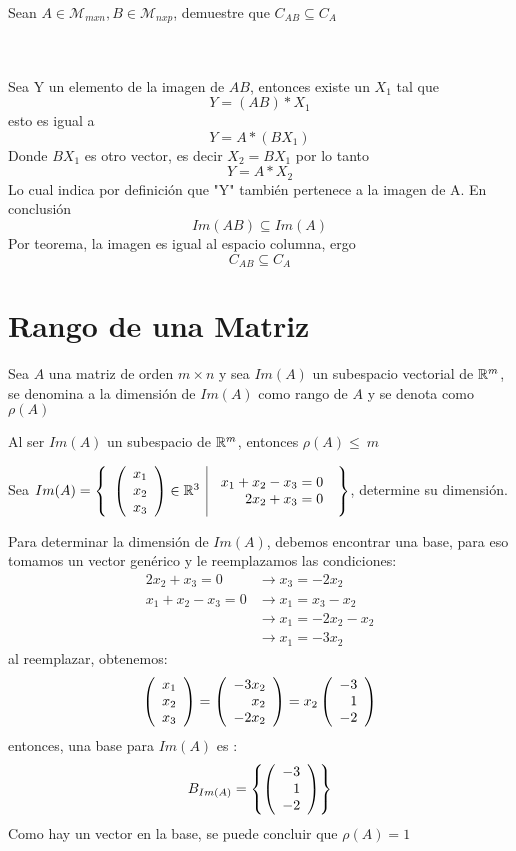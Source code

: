 \begin{ejercicio}
Sean $A\in \mathcal{M}_{mxn}, B \in \mathcal{M}_{nxp}$, demuestre que $C_{AB}\subseteq C_A$


\sol
~\\
~\\
Sea Y un elemento de la imagen de $AB$, entonces existe un $X_1$ tal que 
$$Y=(AB)*X_1$$
esto es igual a 
$$Y=A*(BX_1)$$
Donde $BX_1$ es otro vector, es decir $X_2=BX_1$
por lo tanto
$$Y=A*X_2$$
Lo cual indica por definición que "Y" también pertenece a la imagen de A.
En conclusión $$Im(AB) \subseteq Im(A)$$
Por teorema, la imagen es igual al espacio columna, ergo
$$C_{AB} \subseteq C_A$$

\end{ejercicio}

\newpage
\section{Rango de una Matriz}
\begin{dfn}
Sea $A$ una matriz de orden $m\times n$ y sea $Im(A)$ un subespacio vectorial de $\mathbb{R}^m$, se denomina a la dimensión de $Im(A)$ como rango de $A$ y se denota como $\rho(A)$ 
\end{dfn}
\begin{theorem}[Corolario]
Al ser $Im(A)$ un subespacio de $\mathbb{R}^m$, entonces $\rho(A) \leq~m$
\end{theorem} 

\begin{ejemplo}
Sea $Im(A)= \left\{\begin{array}{c|c} {\left( \begin{array}{c} x_1\\ x_2\\ x_3 \end{array}\right) \in \mathbb{R}^3 }&{\begin{array}{r}
    x_1 + x_2 - x_3 = 0\\
    2x_2 + x_3 = 0
\end{array}} \end{array} \right\}$, determine su dimensión.
\end{ejemplo}
\sol 
Para determinar la dimensión de $Im(A)$, debemos encontrar una base, para eso tomamos un vector genérico y le reemplazamos las condiciones:
\begin{align*}
    2x_2 + x_3 = 0 &\rightarrow x_3 = -2x_2\\
    x_1 + x_2 - x_3 = 0 &\rightarrow x_1 = x_3 - x_2\\ 
    &\rightarrow x_1 = -2x_2 - x_2\\
    &\rightarrow x_1 = -3x_2
\end{align*}
al reemplazar, obtenemos:
\[ \left( \begin{array}{r} x_1\\ x_2\\ x_3 \end{array} \right)  = \left( \begin{array}{r} -3x_2\\ x_2\\ -2x_2 \end{array} \right)   = x_2\left( \begin{array}{r} -3\\ 1\\ -2 \end{array} \right) \]
entonces, una base para $Im(A)$ es :
$$B_{Im(A)} =  \left\{\left( \begin{array}{r} -3\\ 1\\ -2 \end{array} \right)  \right\} $$
Como hay un vector en la base, se puede concluir que $\rho(A) = 1$\\

